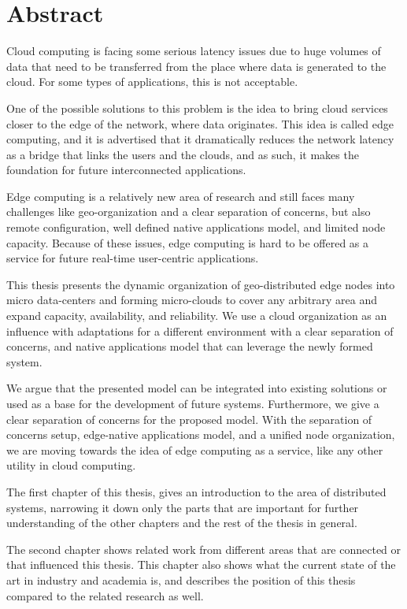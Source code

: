 \chapter*{Abstract}
Cloud computing is facing some serious latency issues due to huge volumes of data that need to be transferred from the place where data is generated to the cloud. For some types of applications, this is not acceptable. 

One of the possible solutions to this problem is the idea to bring cloud services closer to the edge of the network, where data originates. This idea is called edge computing, and it is advertised that it dramatically reduces the network latency as a bridge that links the users and the clouds, and as such, it makes the foundation for future interconnected applications.

Edge computing is a relatively new area of research
and still faces many challenges like geo-organization and a clear separation of concerns, but also remote configuration, well defined native applications model, and limited node capacity. Because of these issues, edge computing is hard to be offered as a service for future real-time user-centric applications. 

This thesis presents the dynamic organization of geo-distributed edge nodes into micro data-centers and forming micro-clouds to cover any arbitrary area and expand capacity, availability, and reliability. We use a cloud organization as an influence with adaptations for a different environment with a clear separation of concerns, and native applications model that can leverage the newly formed system.

We argue that the presented model can be integrated into existing solutions or used as a base for the development of future systems. Furthermore, we give a clear separation of concerns for the proposed model. With the separation of concerns setup, edge-native applications model, and a unified node organization, we are moving towards the idea of edge computing as a service, like any other utility in cloud computing. 

The first chapter of this thesis, gives an introduction to the area of distributed systems, narrowing it down only the parts that are important for further understanding of the other chapters and the rest of the thesis in general.

The second chapter shows related work from different areas that are connected or that influenced this thesis. This chapter also shows what the current state of the art in industry and academia is, and describes the position of this thesis compared to the related research as well.


